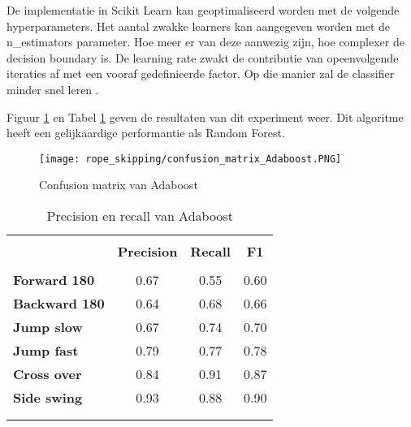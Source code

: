 De implementatie in Scikit Learn kan geoptimaliseerd worden met de volgende hyperparameters. Het aantal zwakke learners kan aangegeven worden met de n\_estimators parameter. Hoe meer er van deze aanwezig zijn, hoe complexer de decision boundary is.
De learning rate zwakt de contributie van opeenvolgende iteraties af met een vooraf gedefinieerde factor. Op die manier zal de classifier minder snel leren \cite{ref36}.

Figuur \ref{fig:adaboost} en Tabel \ref{tab:adaboost} geven de resultaten van dit experiment weer. Dit algoritme heeft een gelijkaardige performantie als Random Forest.

\begin{figure}[!htpd]
\centering
\caption{Confusion matrix van Adaboost}\label{fig:adaboost}
\texttt{[image: rope\_skipping/confusion\_matrix\_Adaboost.PNG]} 
\end{figure}

\begin{table}[!htpd]
  \centering
  \caption{Precision en recall van Adaboost}
  \label{tab:adaboost}
\begin{tabular}{lccc}
 \hline \\
\textbf{}             & \textbf{Precision} & \textbf{Recall} & \textbf{F1} &  \\
\hline \\
\textbf{Forward 180}  & 0.67               & 0.55            & 0.60        &  \\
\textbf{Backward 180} & 0.64               & 0.68            & 0.66        &  \\
\textbf{Jump slow}    & 0.67               & 0.74            & 0.70        &  \\
\textbf{Jump fast}    & 0.79               & 0.77            & 0.78        &  \\
\textbf{Cross over}   & 0.84               & 0.91            & 0.87        &  \\
\textbf{Side swing}   & 0.93               & 0.88            & 0.90        & \\\\
\hline \\
\end{tabular}
\end{table}


